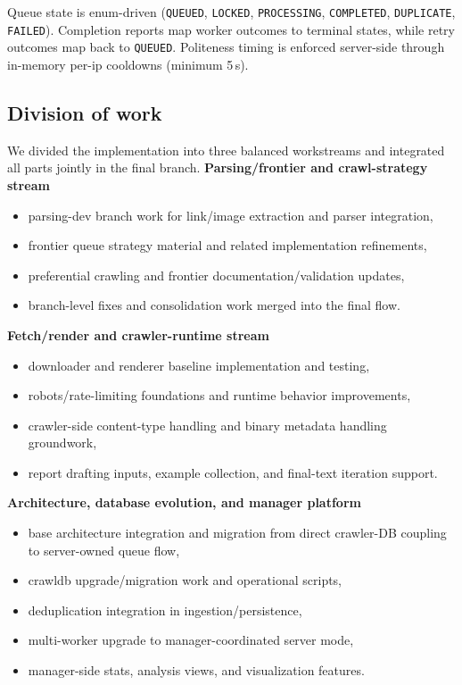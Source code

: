 \documentclass[9pt]{IEEEtran}
\begin{document}
Queue state is enum-driven (\texttt{QUEUED}, \texttt{LOCKED}, \texttt{PROCESSING}, \texttt{COMPLETED}, \texttt{DUPLICATE}, \texttt{FAILED}).
Completion reports map worker outcomes to terminal states, while retry outcomes map back to \texttt{QUEUED}. Politeness timing is enforced server-side through
in-memory per-ip cooldowns (minimum 5\,s).

\subsection{Division of work}
We divided the implementation into three balanced workstreams and integrated all parts jointly in the final branch.
\noindent\textbf{Parsing/frontier and crawl-strategy stream}
\begin{itemize}
    \item parsing-dev branch work for link/image extraction and parser integration,
    \item frontier queue strategy material and related implementation refinements,
    \item preferential crawling and frontier documentation/validation updates,
    \item branch-level fixes and consolidation work merged into the final flow.
\end{itemize}

\noindent\textbf{Fetch/render and crawler-runtime stream}
\begin{itemize}
    \item downloader and renderer baseline implementation and testing,
    \item robots/rate-limiting foundations and runtime behavior improvements,
    \item crawler-side content-type handling and binary metadata handling groundwork,
    \item report drafting inputs, example collection, and final-text iteration support.
\end{itemize}

\noindent\textbf{Architecture, database evolution, and manager platform}
\begin{itemize}
    \item base architecture integration and migration from direct crawler-DB coupling to server-owned queue flow,
    \item crawldb upgrade/migration work and operational scripts,
    \item deduplication integration in ingestion/persistence,
    \item multi-worker upgrade to manager-coordinated server mode,
    \item manager-side stats, analysis views, and visualization features.
\end{itemize}
\end{document}
